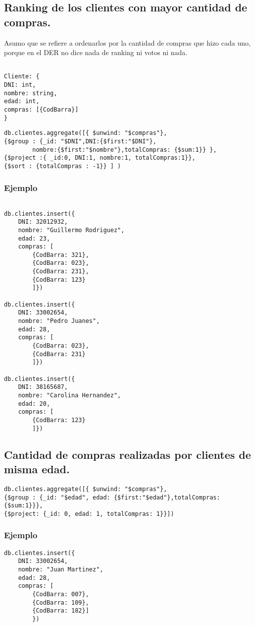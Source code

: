 \subsection{Ranking de los clientes con mayor cantidad de compras.}
Asumo que se refiere a ordenarlos por la cantidad de compras que hizo cada uno, porque en el DER no dice nada de ranking ni votos ni nada.
\begin{lstlisting}

Cliente: {
DNI: int,
nombre: string,
edad: int,
compras: [{CodBarra}]
}
\end{lstlisting}

\begin{lstlisting}
db.clientes.aggregate([{ $unwind: "$compras"}, 
{$group : {_id: "$DNI",DNI:{$first:"$DNI"},
		nombre:{$first:"$nombre"},totalCompras: {$sum:1}} }, 
{$project :{ _id:0, DNI:1, nombre:1, totalCompras:1}}, 
{$sort : {totalCompras : -1}} ] )
\end{lstlisting}
\subsubsection{Ejemplo}
\begin{lstlisting}

db.clientes.insert({
	DNI: 32012932, 
	nombre: "Guillermo Rodriguez", 
	edad: 23, 
	compras: [
		{CodBarra: 321},
		{CodBarra: 023},
		{CodBarra: 231},
		{CodBarra: 123}
		]})

db.clientes.insert({
	DNI: 33002654, 
	nombre: "Pedro Juanes", 
	edad: 28, 
	compras: [
		{CodBarra: 023},
		{CodBarra: 231}
		]})

db.clientes.insert({
	DNI: 38165687, 
	nombre: "Carolina Hernandez", 
	edad: 20, 
	compras: [
		{CodBarra: 123}
		]})
\end{lstlisting}


\subsection{Cantidad de compras realizadas por clientes de misma edad.}
\begin{lstlisting}
db.clientes.aggregate([{ $unwind: "$compras"}, 
{$group : {_id: "$edad", edad: {$first:"$edad"},totalCompras:{$sum:1}}}, 
{$project: {_id: 0, edad: 1, totalCompras: 1}}])
\end{lstlisting}
\subsubsection{Ejemplo}
\begin{lstlisting}
db.clientes.insert({
	DNI: 33002654, 
	nombre: "Juan Martinez", 
	edad: 28, 
	compras: [
		{CodBarra: 007},
		{CodBarra: 109},
		{CodBarra: 182}]
		})
\end{lstlisting}

